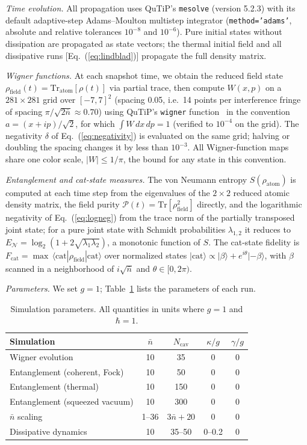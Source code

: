 \documentclass{iopjournal}
\begin{document}
\textit{Time evolution.} All propagation uses QuTiP's \texttt{mesolve} (version 5.2.3) with its default adaptive-step Adams--Moulton multistep integrator (\texttt{method='adams'}, absolute and relative tolerances $10^{-8}$ and $10^{-6}$). Pure initial states without dissipation are propagated as state vectors; the thermal initial field and all dissipative runs [Eq.~(\ref{eq:lindblad})] propagate the full density matrix.

\textit{Wigner functions.} At each snapshot time, we obtain the reduced field state $\rho_{\text{field}}(t) = \text{Tr}_{\text{atom}}[\rho(t)]$ via partial trace, then compute $W(x,p)$ on a $281 \times 281$ grid over $[-7, 7]^2$ (spacing 0.05, i.e.\ 14 points per interference fringe of spacing $\pi/\sqrt{2\bar{n}} \approx 0.70$) using QuTiP's \texttt{wigner} function~\cite{johansson2012} in the convention $a = (x + ip)/\sqrt{2}$, for which $\int W\,dx\,dp = 1$ (verified to $10^{-4}$ on the grid). The negativity $\delta$ of Eq.~(\ref{eq:negativity}) is evaluated on the same grid; halving or doubling the spacing changes it by less than $10^{-3}$. All Wigner-function maps share one color scale, $|W| \leq 1/\pi$, the bound for any state in this convention.

\textit{Entanglement and cat-state measures.} The von Neumann entropy $S(\rho_{\text{atom}})$ is computed at each time step from the eigenvalues of the $2 \times 2$ reduced atomic density matrix, the field purity $\mathcal{P}(t) = \text{Tr}[\rho_{\text{field}}^2]$ directly, and the logarithmic negativity of Eq.~(\ref{eq:logneg}) from the trace norm of the partially transposed joint state; for a pure joint state with Schmidt probabilities $\lambda_{1,2}$ it reduces to $E_{\mathcal{N}} = \log_2(1 + 2\sqrt{\lambda_1\lambda_2})$, a monotonic function of $S$. The cat-state fidelity is $F_{\text{cat}} = \max\,\langle \text{cat}|\rho_{\text{field}}|\text{cat}\rangle$ over normalized states $|\text{cat}\rangle \propto |\beta\rangle + e^{i\theta}|{-\beta}\rangle$, with $\beta$ scanned in a neighborhood of $i\sqrt{\bar{n}}$ and $\theta \in [0, 2\pi)$.

\textit{Parameters.} We set $g = 1$; Table~\ref{tab:params} lists the parameters of each run.

\begin{table}
\centering
\caption{Simulation parameters. All quantities in units where $g = 1$ and $\hbar = 1$.}
\begin{tabular}{lcccc}
\hline
Simulation & $\bar{n}$ & $N_{\text{cav}}$ & $\kappa/g$ & $\gamma/g$ \\
\hline
Wigner evolution & 10 & 35 & 0 & 0 \\
Entanglement (coherent, Fock) & 10 & 50 & 0 & 0 \\
Entanglement (thermal) & 10 & 150 & 0 & 0 \\
Entanglement (squeezed vacuum) & 10 & 300 & 0 & 0 \\
$\bar{n}$ scaling & 1--36 & $3\bar{n}+20$ & 0 & 0 \\
Dissipative dynamics & 10 & 35--50 & 0--0.2 & 0 \\
\hline
\end{tabular}
\label{tab:params}
\end{table}
\end{document}

